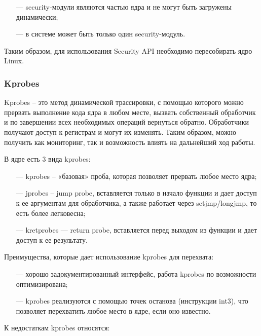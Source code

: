\begin{itemize}[leftmargin=0.7cm +  - ]
	\item[---] security-модули являются частью ядра и не могут быть загружены динамически;
	\item[---] в системе может быть только один security-модуль.
\end{itemize}

Таким образом, для использования Security API необходимо пересобирать ядро Linux.

\subsubsection{Kprobes}

Kprobes -- это метод динамической трассировки, с помощью которого можно прервать выполнение кода ядра в любом месте, вызвать собственный обработчик и по завершении всех необходимых операций вернуться обратно. Обработчики получают доступ к регистрам и могут их изменять. Таким образом, можно получить как мониторинг, так и возможность влиять на дальнейший ход работы.

В ядре есть 3 вида kprobes:

\begin{itemize}[leftmargin=0.7cm +  - ]
	\item[---] kprobes -- «базовая» проба, которая позволяет прервать любое место ядра;
	\item[---] jprobes -- jump probe, вставляется только в начало функции и дает доступ к ее аргументам для обработчика, а также работает через setjmp/longjmp, то есть более легковесна;
	\item[---] kretprobes — return probe, вставляется перед выходом из функции и дает доступ к ее результату.
\end{itemize}

Преимущества, которые дает использование kprobes для перехвата:

\begin{itemize}[leftmargin=0.7cm +  - ]
	\item[---] хорошо задокументированный интерфейс, работа kprobes по возможности оптимизирована;
	\item[---] kprobes реализуются с помощью точек останова (инструкции int3), что позволяет перехватить любое место в ядре, если оно известно.
\end{itemize}

К недостаткам kprobes относятся:

